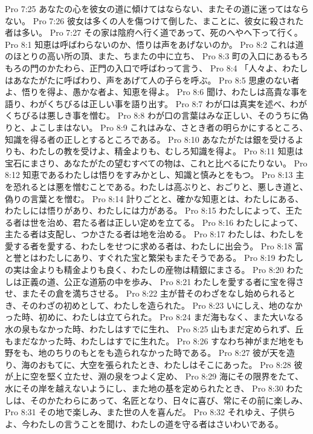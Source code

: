 Pro 7:25  あなたの心を彼女の道に傾けてはならない、またその道に迷ってはならない。
Pro 7:26  彼女は多くの人を傷つけて倒した、まことに、彼女に殺された者は多い。
Pro 7:27  その家は陰府へ行く道であって、死のへやへ下って行く。
Pro 8:1  知恵は呼ばわらないのか、悟りは声をあげないのか。
Pro 8:2  これは道のほとりの高い所の頂、また、ちまたの中に立ち、
Pro 8:3  町の入口にあるもろもろの門のかたわら、正門の入口で呼ばわって言う、
Pro 8:4  「人々よ、わたしはあなたがたに呼ばわり、声をあげて人の子らを呼ぶ。
Pro 8:5  思慮のない者よ、悟りを得よ、愚かな者よ、知恵を得よ。
Pro 8:6  聞け、わたしは高貴な事を語り、わがくちびるは正しい事を語り出す。
Pro 8:7  わが口は真実を述べ、わがくちびるは悪しき事を憎む。
Pro 8:8  わが口の言葉はみな正しい、そのうちに偽りと、よこしまはない。
Pro 8:9  これはみな、さとき者の明らかにするところ、知識を得る者の正しとするところである。
Pro 8:10  あなたがたは銀を受けるよりも、わたしの教を受けよ、精金よりも、むしろ知識を得よ。
Pro 8:11  知恵は宝石にまさり、あなたがたの望むすべての物は、これと比べるにたりない。
Pro 8:12  知恵であるわたしは悟りをすみかとし、知識と慎みとをもつ。
Pro 8:13  主を恐れるとは悪を憎むことである。わたしは高ぶりと、おごりと、悪しき道と、偽りの言葉とを憎む。
Pro 8:14  計りごとと、確かな知恵とは、わたしにある、わたしには悟りがあり、わたしには力がある。
Pro 8:15  わたしによって、王たる者は世を治め、君たる者は正しい定めを立てる。
Pro 8:16  わたしによって、主たる者は支配し、つかさたる者は地を治める。
Pro 8:17  わたしは、わたしを愛する者を愛する、わたしをせつに求める者は、わたしに出会う。
Pro 8:18  富と誉とはわたしにあり、すぐれた宝と繁栄もまたそうである。
Pro 8:19  わたしの実は金よりも精金よりも良く、わたしの産物は精銀にまさる。
Pro 8:20  わたしは正義の道、公正な道筋の中を歩み、
Pro 8:21  わたしを愛する者に宝を得させ、またその倉を満ちさせる。
Pro 8:22  主が昔そのわざをなし始められるとき、そのわざの初めとして、わたしを造られた。
Pro 8:23  いにしえ、地のなかった時、初めに、わたしは立てられた。
Pro 8:24  まだ海もなく、また大いなる水の泉もなかった時、わたしはすでに生れ、
Pro 8:25  山もまだ定められず、丘もまだなかった時、わたしはすでに生れた。
Pro 8:26  すなわち神がまだ地をも野をも、地のちりのもとをも造られなかった時である。
Pro 8:27  彼が天を造り、海のおもてに、大空を張られたとき、わたしはそこにあった。
Pro 8:28  彼が上に空を堅く立たせ、淵の泉をつよく定め、
Pro 8:29  海にその限界をたて、水にその岸を越えないようにし、また地の基を定められたとき、
Pro 8:30  わたしは、そのかたわらにあって、名匠となり、日々に喜び、常にその前に楽しみ、
Pro 8:31  その地で楽しみ、また世の人を喜んだ。
Pro 8:32  それゆえ、子供らよ、今わたしの言うことを聞け、わたしの道を守る者はさいわいである。

